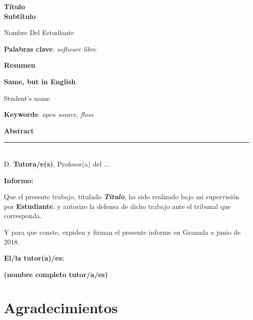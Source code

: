 \thispagestyle{empty}

\begin{center}
{\large\bfseries Título \\ Subtítulo }\\
\end{center}
\begin{center}
Nombre Del Estudiante\\
\end{center}


\vspace{0.5cm}
\noindent\textbf{Palabras clave}: \textit{software libre}
\vspace{0.7cm}

\noindent\textbf{Resumen}\\
	

\cleardoublepage

\begin{center}
	{\large\bfseries Same, but in English}\\
\end{center}
\begin{center}
	Student's name\\
\end{center}
\vspace{0.5cm}
\noindent\textbf{Keywords}: \textit{open source}, \textit{floss}
\vspace{0.7cm}

\noindent\textbf{Abstract}\\


\cleardoublepage

\thispagestyle{empty}

\noindent\rule[-1ex]{\textwidth}{2pt}\\[4.5ex]

D. \textbf{Tutora/e(s)}, Profesor(a) del ...

\vspace{0.5cm}

\textbf{Informo:}

\vspace{0.5cm}

Que el presente trabajo, titulado \textit{\textbf{Título}},
ha sido realizado bajo mi supervisión por \textbf{Estudiante}, y autorizo la defensa de dicho trabajo ante el tribunal
que corresponda.

\vspace{0.5cm}

Y para que conste, expiden y firman el presente informe en Granada a junio de 2018.

\vspace{1cm}

\textbf{El/la tutor(a)/es: }

\vspace{5cm}

\noindent \textbf{(nombre completo tutor/a/es)}

\chapter*{Agradecimientos}




